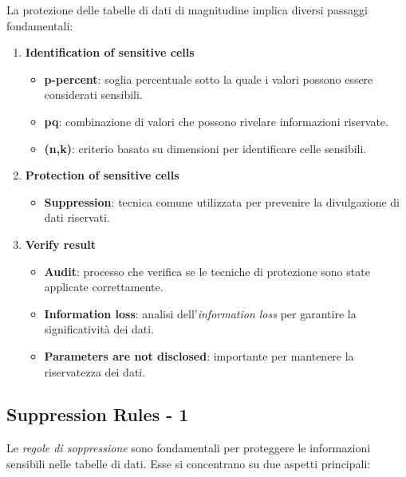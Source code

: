 \documentclass{report}
\begin{document}
\noindent La protezione delle tabelle di dati di magnitudine implica diversi passaggi fondamentali:
\begin{enumerate}
    \item \textbf{Identification of sensitive cells}
    \begin{itemize}
        \item \textbf{p-percent}: soglia percentuale sotto la quale i valori possono essere considerati sensibili.
        \item \textbf{pq}: combinazione di valori che possono rivelare informazioni riservate.
        \item \textbf{(n,k)}: criterio basato su dimensioni per identificare celle sensibili.
    \end{itemize}
    
    \item \textbf{Protection of sensitive cells}
    \begin{itemize}
        \item \textbf{Suppression}: tecnica comune utilizzata per prevenire la divulgazione di dati riservati.
    \end{itemize}
    
    \item \textbf{Verify result}
    \begin{itemize}
        \item \textbf{Audit}: processo che verifica se le tecniche di protezione sono state applicate correttamente.
        \item \textbf{Information loss}: analisi dell'\textit{information loss} per garantire la significatività dei dati.
        \item \textbf{Parameters are not disclosed}: importante per mantenere la riservatezza dei dati.
    \end{itemize}
\end{enumerate}

\subsection{Suppression Rules - 1}

Le \textit{regole di soppressione} sono fondamentali per proteggere le informazioni sensibili nelle tabelle di dati. Esse si concentrano su due aspetti principali:
\end{document}
